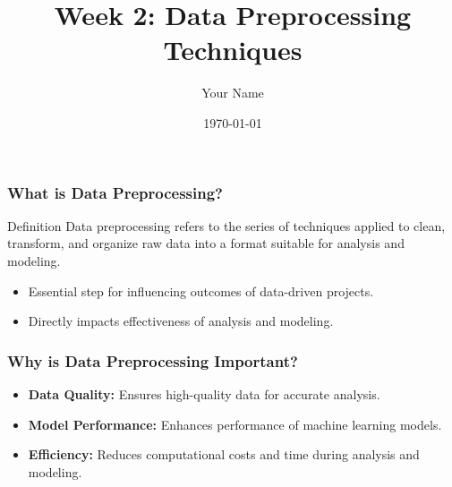 \documentclass{beamer}
\title{Week 2: Data Preprocessing Techniques}
\author{Your Name}
\institute{Your Institution}
\date{\today}
\begin{document}
\frame{\titlepage}

\begin{frame}[fragile]
    \titlepage
\end{frame}

\begin{frame}[fragile]
    \frametitle{What is Data Preprocessing?}
    \begin{block}{Definition}
        Data preprocessing refers to the series of techniques applied to clean, transform, and organize raw data into a format suitable for analysis and modeling.
    \end{block}
    \begin{itemize}
        \item Essential step for influencing outcomes of data-driven projects.
        \item Directly impacts effectiveness of analysis and modeling.
    \end{itemize}
\end{frame}

\begin{frame}[fragile]
    \frametitle{Why is Data Preprocessing Important?}
    \begin{itemize}
        \item \textbf{Data Quality:} Ensures high-quality data for accurate analysis.
        \item \textbf{Model Performance:} Enhances performance of machine learning models.
        \item \textbf{Efficiency:} Reduces computational costs and time during analysis and modeling.
    \end{itemize}
\end{frame}
\end{document}

